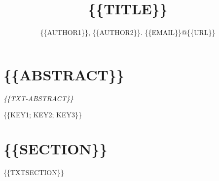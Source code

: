 \documentclass[
	a4paper,
	journal,
	compsoc,
	final
]{IEEEtran}
\newcommand{\revisar}[1]{\todo[backgroundcolor=yellow!50,inline]{#1}}
\begin{document}
	\renewcommand{\tablename}{Tabla}

    \title{ \{\{TITLE\}\} }

	\ifdefined\peerreview
	\else
	\author{
		\{\{AUTHOR1\}\}, \{\{AUTHOR2\}\}.
		\{\{EMAIL\}\}@\{\{URL\}\}
	} 
	\fi


	\ifdefined\peerreview
	\else
	\fi

	\maketitle


	\section*{ \{\{ABSTRACT\}\} }
		\emph{ \{\{TXT-ABSTRACT\}\} }

	\bigskip

	\begin{IEEEkeywords}
		\{\{KEY1; KEY2; KEY3\}\}
	\end{IEEEkeywords}


	\section{ \{\{SECTION\}\} }
	\{\{TXTSECTION\}\}\cite{bakkalbasi2006three}
	

\end{document}
